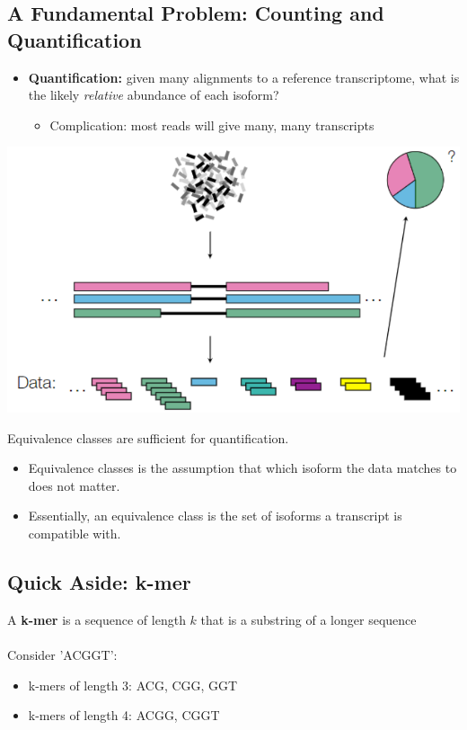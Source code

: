 \documentclass[10pt]{article}
\begin{document}
\subsection*{A Fundamental Problem: Counting and Quantification}
\begin{itemize}
    \item \textbf{Quantification:} given many alignments to a reference transcriptome, what is the likely \textit{relative} abundance of each isoform?
    \begin{itemize}
        \item Complication: most reads will give many, many transcripts
    \end{itemize}
\end{itemize}
\begin{center}
    \includegraphics*[scale=0.75]{W4_2.png}
\end{center}
Equivalence classes are sufficient for quantification.
\begin{itemize}
    \item Equivalence classes is the assumption that which isoform the data matches to does not matter.
    \item Essentially, an equivalence class is the set of isoforms a transcript is compatible with.
\end{itemize}   

\subsection*{Quick Aside: k-mer}
A \textbf{k-mer} is a sequence of length $k$ that is a substring of a longer sequence\\\\
Consider 'ACGGT':
\begin{itemize}
    \item k-mers of length 3: ACG, CGG, GGT
    \item k-mers of length 4: ACGG, CGGT
\end{itemize}
\end{document}
